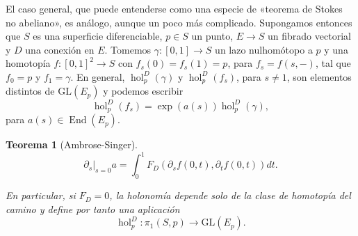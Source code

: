 \documentclass[12pt,a4paper]{article}
\newtheorem{thm}{Teorema}[section]
\theoremstyle{definition} \newtheorem{defn}[thm]{Definición}
\theoremstyle{definition} \newtheorem{ejemplo}[thm]{Ejemplo}
\theoremstyle{definition} \newtheorem{ejercicio}[thm]{Ejercicio}
\def\GL{\mathrm{GL}}
\DeclareMathOperator{\hol}{hol}
\DeclareMathOperator{\End}{End}
\begin{document}
	  El caso general, que puede entenderse como una especie de «teorema de Stokes no abeliano», es análogo, aunque un poco más complicado. Supongamos entonces que $S$ es una superficie diferenciable, $p\in S$ un punto, $E\rightarrow S$ un fibrado vectorial y $D$ una conexión en $E$. Tomemos $\gamma:[0,1]\rightarrow S$ un lazo nulhomótopo a $p$ y una homotopía $f:[0,1]^2 \rightarrow S$ con $f_s(0)=f_s(1)=p$, para $f_s=f(s,-)$, tal que $f_0=p$ y $f_1=\gamma$. En general, $\hol^D_p(\gamma)$ y $\hol^D_p(f_s)$, para $s\neq 1$, son elementos distintos de $\GL(E_p)$ y podemos escribir
	  \begin{equation*}
	    \hol^D_p(f_s) = \exp(a(s)) \hol^D_p(\gamma),
	  \end{equation*}
	  para $a(s) \in \End(E_p)$. 

	  \begin{thm}[Ambrose-Singer]
     	      \begin{equation*}
		\partial_s|_{s=0} a = \int_0^1 F_D(\partial_s f(0,t),\partial_t f(0,t)) dt. 
	      \end{equation*}

	      En particular, si $F_D=0$, la holonomía depende solo de la clase de homotopía del camino y define por tanto una aplicación
	      \begin{equation*}
		\hol^D_p: \pi_1(S,p) \rightarrow \GL(E_p).
	      \end{equation*}
	  \end{thm}
\end{document}
